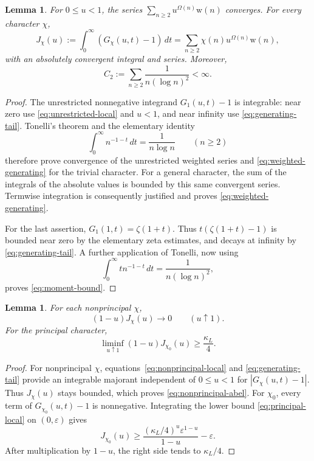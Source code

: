\documentclass[11pt,reqno]{amsart}
\newtheorem{lemma}[theorem]{Lemma}
\theoremstyle{definition}
\theoremstyle{remark}
\numberwithin{equation}{section}
\newcommand{\Om}{\Omega}
\newcommand{\wt}{\mathrm w}
\begin{document}
\begin{lemma}\label{lem:integrability}
For $0\leq u<1$, the series $\sum_{n\geq2}u^{\Om(n)}\wt(n)$
converges. For every character $\chi$,
\begin{equation}\label{eq:weighted-generating}
 J_\chi(u):=\int_0^\infty(G_\chi(u,t)-1)\,dt
     =\sum_{n\geq2}\chi(n)u^{\Om(n)}\wt(n),
\end{equation}
with an absolutely convergent integral and series. Moreover,
\begin{equation}\label{eq:moment-bound}
 C_2:=\sum_{n\geq2}\frac1{n(\log n)^2}<\infty.
\end{equation}
\end{lemma}

\begin{proof}
The unrestricted nonnegative integrand $G_1(u,t)-1$ is integrable:
near zero use \eqref{eq:unrestricted-local} and $u<1$, and near infinity
use \eqref{eq:generating-tail}. Tonelli's theorem and the elementary
identity
\[
 \int_0^\infty n^{-1-t}\,dt=\frac1{n\log n}\qquad(n\geq2)
\]
therefore prove convergence of the unrestricted weighted series and
\eqref{eq:weighted-generating} for the trivial character. For a general
character, the sum of the integrals of the absolute values is bounded by
this same convergent series. Termwise integration is consequently
justified and proves \eqref{eq:weighted-generating}.

For the last assertion, $G_1(1,t)=\zeta(1+t)$. Thus
$t(\zeta(1+t)-1)$ is bounded near zero by the elementary zeta estimates,
and decays at infinity by \eqref{eq:generating-tail}. A further
application of Tonelli, now using
\[
 \int_0^\infty t n^{-1-t}\,dt=\frac1{n(\log n)^2},
\]
proves \eqref{eq:moment-bound}.
\end{proof}

\begin{lemma}\label{lem:character-abel}
For each nonprincipal $\chi$,
\begin{equation}\label{eq:nonprincipal-abel}
 (1-u)J_\chi(u)\longrightarrow0\qquad(u\uparrow1).
\end{equation}
For the principal character,
\begin{equation}\label{eq:principal-abel}
 \liminf_{u\uparrow1}(1-u)J_{\chi_0}(u)\geq\frac{\kappa_L}{4}.
\end{equation}
\end{lemma}

\begin{proof}
For nonprincipal $\chi$, equations~\eqref{eq:nonprincipal-local} and
\eqref{eq:generating-tail} provide an integrable majorant independent of
$0\leq u<1$ for $|G_\chi(u,t)-1|$. Thus $J_\chi(u)$ stays bounded,
which proves \eqref{eq:nonprincipal-abel}.
For $\chi_0$, every term of $G_{\chi_0}(u,t)-1$ is nonnegative.
Integrating the lower bound \eqref{eq:principal-local} on
$(0,\varepsilon)$ gives
\[
 J_{\chi_0}(u)\geq
 \frac{(\kappa_L/4)^u\varepsilon^{1-u}}{1-u}-\varepsilon.
\]
After multiplication by $1-u$, the right side tends to $\kappa_L/4$.
\end{proof}
\end{document}
